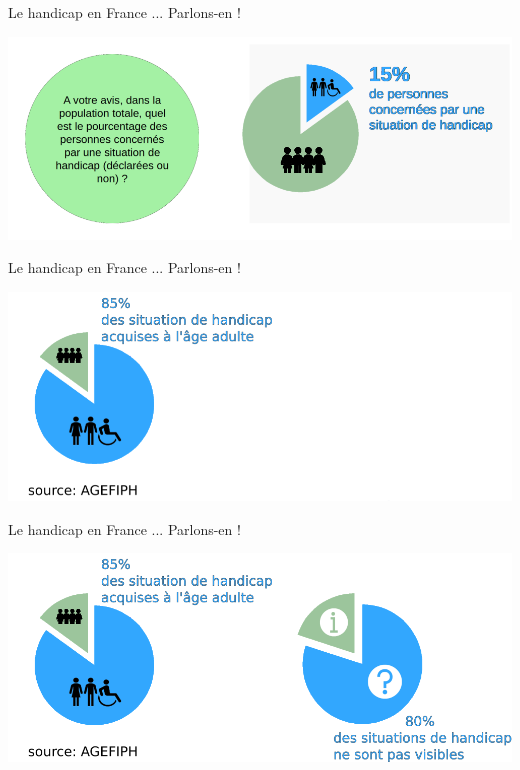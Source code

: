 \documentclass{beamer}
\begin{document}
\begin{frame}
 {Le handicap en France ... Parlons-en ! } 
 
 \includegraphics[width=1\linewidth]{images/handicap_cake1.png} 
 
\end{frame}


\begin{frame}
 {Le handicap en France ... Parlons-en ! } 
 
 \includegraphics[width=1\linewidth]{images/handicap_cake2.png} 
 
\end{frame}


\begin{frame}
 {Le handicap en France ... Parlons-en ! } 
 
 \includegraphics[width=1\linewidth]{images/handicap_cake3.png} 
 
\end{frame}
\end{document}
